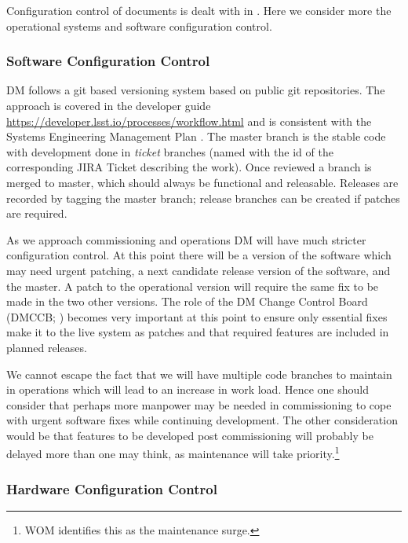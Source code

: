 Configuration control of documents is dealt with in . Here we consider more the operational systems and software configuration control.

\subsubsection{Software Configuration Control}

DM follows a git based versioning system based on public git repositories.  The approach is covered in the developer guide \url{https://developer.lsst.io/processes/workflow.html} and is consistent with the Systems Engineering Management Plan .
The master branch is the stable code with development done in \emph{ticket} branches (named with the id of the corresponding JIRA Ticket describing the work).
Once reviewed a branch is merged to master, which should always be functional and releasable.
Releases are recorded by tagging the master branch; release branches can be created if patches are required.

As we approach commissioning and operations DM will have much stricter configuration control.
At this point there will be a version of the software which may need urgent patching, a next candidate release version of the software, and the master.
A patch to the operational version will require the same fix to be made in the two other versions.
The role of the DM Change Control Board (DMCCB; ) becomes very important at this point to ensure only essential fixes make it to the live system as patches and that required features are included in planned releases.

We cannot escape the fact that we  will have multiple code branches to maintain in operations which will lead to an increase in work load.
Hence one should consider that perhaps more manpower may be needed in commissioning to cope with urgent software fixes while continuing development.
The other consideration would be that features to be developed post commissioning will probably be delayed more than one may think, as maintenance will take priority.\footnote{WOM identifies this as the maintenance surge.}

\subsubsection{Hardware Configuration Control}

